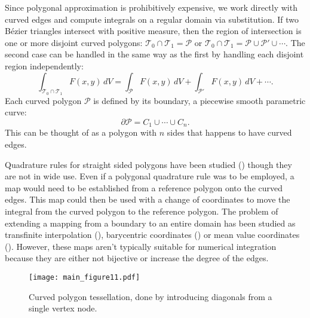 \documentclass[oneside, reqno]{amsart}
\theoremstyle{definition}
\begin{document}
Since polygonal approximation is prohibitively expensive,
we work directly with curved edges and compute integrals on a regular
domain via substitution.
If two B\'{e}zier triangles intersect with positive measure, then
the region of intersection is one or more disjoint curved polygons:
\(\mathcal{T}_0 \cap \mathcal{T}_1 = \mathcal{P}\) or
\(\mathcal{T}_0 \cap \mathcal{T}_1 = \mathcal{P} \cup
\mathcal{P}' \cup \cdots\).
The second case can be handled in the same way as the first by handling each
disjoint region independently:
\begin{equation}
\int_{\mathcal{T}_0 \cap \mathcal{T}_1} F(x, y) \, dV =
  \int_{\mathcal{P}} F(x, y) \, dV +
  \int_{\mathcal{P}'} F(x, y) \, dV + \cdots.
\end{equation}
Each curved polygon \(\mathcal{P}\) is defined by its boundary, a
piecewise smooth parametric curve:
\begin{equation}
\partial \mathcal{P} = C_1 \cup \cdots \cup C_n.
\end{equation}
This can be thought of as a polygon with \(n\) sides that happens to
have curved edges.

Quadrature rules for straight sided polygons have been
studied (\cite{Mousavi2009}) though they are not in wide use. Even
if a polygonal quadrature rule was to be employed, a map would need to be
established from a reference polygon onto the curved edges. This map
could then be used with a change of coordinates to move the integral
from the curved polygon to the reference polygon. The problem of extending
a mapping from a boundary to an entire domain has been studied as
transfinite interpolation
(\cite{chenin:tel-00284680, Gordon1982, Perronnet1998}),
barycentric coordinates (\cite{Wachspress1975}) or mean value coordinates
(\cite{Floater2003}). However, these maps aren't typically suitable for
numerical integration because they are either not bijective or increase the
degree of the edges.

\begin{figure}
  \texttt{[image: main\_figure11.pdf]}
  \centering
  \captionsetup{width=.75\linewidth}
  \caption{Curved polygon tessellation, done by introducing diagonals
    from a single vertex node.}
  \label{fig:tessellated-curved-polygon}
\end{figure}
\end{document}
